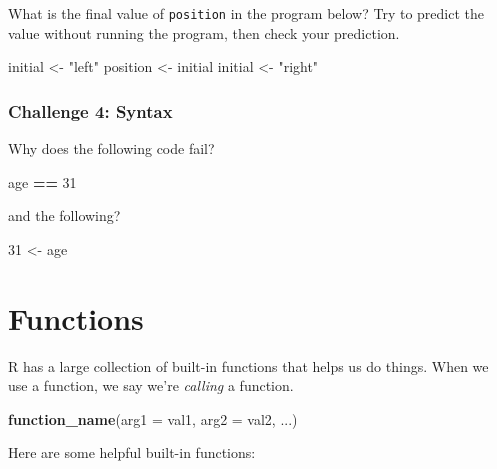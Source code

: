 \documentclass[]{book}
\newenvironment{Shaded}{\begin{snugshade}}{\end{snugshade}}
\newcommand{\KeywordTok}[1]{\textcolor[rgb]{0.13,0.29,0.53}{\textbf{#1}}}
\newcommand{\DataTypeTok}[1]{\textcolor[rgb]{0.13,0.29,0.53}{#1}}
\newcommand{\DecValTok}[1]{\textcolor[rgb]{0.00,0.00,0.81}{#1}}
\newcommand{\StringTok}[1]{\textcolor[rgb]{0.31,0.60,0.02}{#1}}
\newcommand{\OperatorTok}[1]{\textcolor[rgb]{0.81,0.36,0.00}{\textbf{#1}}}
\newcommand{\NormalTok}[1]{#1}
\begin{document}
What is the final value of \texttt{position} in the program below? Try
to predict the value without running the program, then check your
prediction.

\begin{Shaded}
\begin{Highlighting}[]
\NormalTok{initial <-}\StringTok{ "left"}
\NormalTok{position <-}\StringTok{ }\NormalTok{initial}
\NormalTok{initial <-}\StringTok{ "right"}
\end{Highlighting}
\end{Shaded}

\subsubsection*{Challenge 4: Syntax}\label{challenge-4-syntax}

Why does the following code fail?

\begin{Shaded}
\begin{Highlighting}[]
\NormalTok{age }\OperatorTok{==}\StringTok{ }\DecValTok{31}
\end{Highlighting}
\end{Shaded}

and the following?

\begin{Shaded}
\begin{Highlighting}[]
\DecValTok{31}\NormalTok{ <-}\StringTok{  }\NormalTok{age}
\end{Highlighting}
\end{Shaded}

\section{Functions}\label{functions}

R has a large collection of built-in functions that helps us do things.
When we use a function, we say we're \emph{calling} a function.

\begin{Shaded}
\begin{Highlighting}[]
\KeywordTok{function_name}\NormalTok{(}\DataTypeTok{arg1 =}\NormalTok{ val1, }\DataTypeTok{arg2 =}\NormalTok{ val2, ...)}
\end{Highlighting}
\end{Shaded}

Here are some helpful built-in functions:
\end{document}
